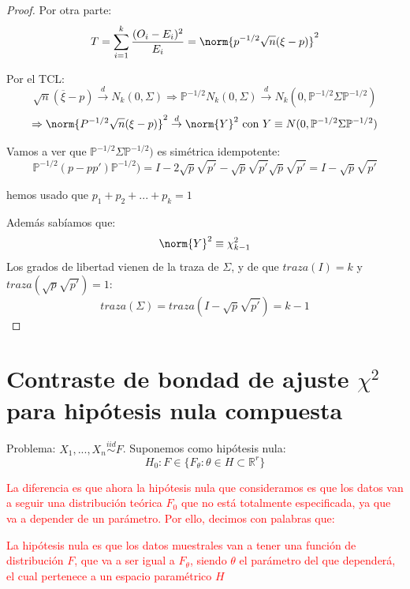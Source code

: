 \documentclass[nochap]{apuntes}
\begin{document}
\begin{proof}
Por otra parte: 
\[
T=\sum_{i=1}^k \frac{(O_i-E_i)^2}{E_i} = \norm{p^{-1/2}\sqrt{n}(\xi-p)}^2
\]

Por el TCL:
\[
\sqrt{n}(\overline{\xi}-p) \stackrel{d}{\rightarrow} N_k(0, \Sigma) \Rightarrow \mathbb{P}^{-1/2}N_k(0, \Sigma) \stackrel{d}{\rightarrow} N_k(0, \mathbb{P}^{-1/2} \Sigma  \mathbb{P}^{-1/2}) 
\]
\[
\Rightarrow \norm{P^{-1/2} \sqrt{n} (\xi-p)}^2 \stackrel{d}{\rightarrow} \norm{Y}^2 \text{ con } Y \equiv N(0,\mathbb{P}^{-1/2} \Sigma  \mathbb{P}^{-1/2})
\]

Vamos a ver que $\mathbb{P}^{-1/2} \Sigma  \mathbb{P}^{-1/2})$ es simétrica idempotente:
\[
\mathbb{P}^{-1/2} (p-pp')\mathbb{P}^{-1/2}) = I-2\sqrt{p}\sqrt{p'}-\sqrt{p}\sqrt{p'}\sqrt{p}\sqrt{p'}=I-\sqrt{p}\sqrt{p'}
\]

hemos usado que $p_1+p_2+...+p_k=1$

Además sabíamos que:
\[
\norm{Y}^2 \equiv \chi^2_{k-1}
\]
Los grados de libertad vienen de la traza de $\Sigma$, y de que $traza(I)=k$ y $traza(\sqrt{p}\sqrt{p'})=1$: 
\[
traza(\Sigma)=traza(I-\sqrt{p}\sqrt{p'})=k-1
\]
\end{proof}

\section{Contraste de bondad de ajuste $\chi^2$ para hipótesis nula compuesta}

Problema: $X_1,...,X_n \stackrel{iid}{\sim} F$. Suponemos como hipótesis nula:
\[
H_0 : F \in \{F_{\theta}: \theta \in H \subset \mathbb{R}^r\}
\]

\textcolor{red}{La diferencia es que ahora la hipótesis nula que consideramos es que los datos van a seguir una distribución teórica $F_0$ que no está totalmente especificada, ya que va a depender de un parámetro. Por ello, decimos con palabras que:}

\textcolor{red}{La hipótesis nula es que los datos muestrales van a tener una función de distribución $F$, que va a ser igual a $F_{\theta}$, siendo $\theta$ el parámetro del que dependerá, el cual pertenece a un espacio paramétrico $H$}
\end{document}
